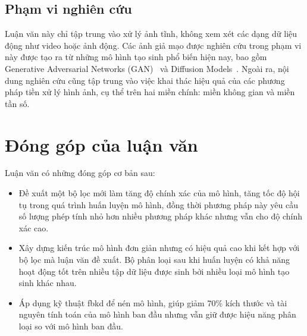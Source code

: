 \subsection{Phạm vi nghiên cứu}

%

Luận văn này chỉ tập trung vào xử lý ảnh tĩnh, không xem xét các dạng dữ liệu động như video hoặc ảnh động. Các ảnh giả mạo được nghiên cứu trong phạm vi này được tạo ra từ những mô hình tạo sinh phổ biến hiện nay, bao gồm Generative Adversarial Networks (GAN)~\cite{Goodfellow2014GenerativeAN} và Diffusion Models~\cite{Ho2020DenoisingDP}. Ngoài ra, nội dung nghiên cứu cũng tập trung vào việc khai thác hiệu quả của các phương pháp tiền xử lý hình ảnh, cụ thể trên hai miền chính: miền không gian và miền tần số.


\section{Đóng góp của luận văn}
Luận văn có những đóng góp cơ bản sau:
\begin{itemize}
	\item Đề xuất một bộ lọc mới làm tăng độ chính xác của mô hình, tăng tốc độ hội tụ trong quá trình huấn luyện mô hình, đồng thời phương pháp này yêu cầu số lượng phép tính nhỏ hơn nhiều phương pháp khác nhưng vẫn cho độ chính xác cao.
	\item Xây dựng kiến trúc mô hình đơn giản nhưng có hiệu quả cao khi kết hợp với bộ lọc mà luận văn đề xuất. Bộ phân loại sau khi huấn luyện có khả năng hoạt động tốt trên nhiều tập dữ liệu được sinh bởi nhiều loại mô hình tạo sinh khác nhau.
	\item Áp dụng kỹ thuật \gls{fbkd} để nén mô hình, giúp giảm 70\% kích thước và tài nguyên tính toán của mô hình ban đầu nhưng vẫn giữ được hiệu năng phân loại so với mô hình ban đầu.

\end{itemize}


